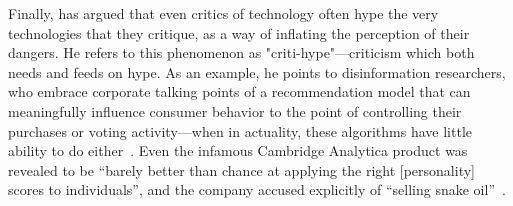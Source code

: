 \documentclass[acmconf,manuscript,screen,natbib=true]{acmart}
\begin{document}
Finally, \citet{vinsel_critihype} has argued that even critics of technology often hype the very technologies that they critique, as a way of inflating the perception of their dangers. %
He refers to this phenomenon as "criti-hype"---criticism which both needs and feeds on hype. As an example, he points to disinformation researchers, who embrace corporate talking points of a recommendation model that can meaningfully influence consumer behavior to the point of controlling their purchases or voting activity---when in actuality, these algorithms have little ability to do either~\cite{hwang2020subprime, badnews, robertson2021engagement,gibney2018scant,hern2018cambridge}. Even the infamous Cambridge Analytica product was revealed to be ``barely better than chance at applying the right [personality] scores to individuals'', and the company accused explicitly of ``selling snake oil''~\cite{hern2018cambridge}.  %






\end{document}
